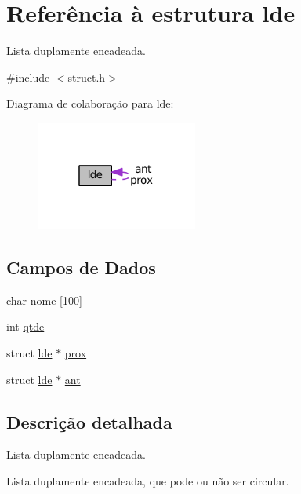 \hypertarget{structlde}{}\section{Referência à estrutura lde}
\label{structlde}


Lista duplamente encadeada.  




{\ttfamily \#include $<$struct.\+h$>$}



Diagrama de colaboração para lde\+:\nopagebreak
\begin{figure}[H]
\begin{center}
\leavevmode
\includegraphics[width=151pt]{structlde__coll__graph}
\end{center}
\end{figure}
\subsection*{Campos de Dados}
\begin{DoxyCompactItemize}
\item 
char \hyperlink{structlde_aa4e90ca99702bac9e1c78503ad86acba}{nome} \mbox{[}100\mbox{]}
\item 
int \hyperlink{structlde_aa8a45bf920d47706309cd931134d5219}{qtde}
\item 
struct \hyperlink{structlde}{lde} $\ast$ \hyperlink{structlde_a842cbaea6d55e782335dcad1a6992695}{prox}
\item 
struct \hyperlink{structlde}{lde} $\ast$ \hyperlink{structlde_a9533d032f1309656dcf523f30de08484}{ant}
\end{DoxyCompactItemize}


\subsection{Descrição detalhada}
Lista duplamente encadeada. 

Lista duplamente encadeada, que pode ou não ser circular. 
